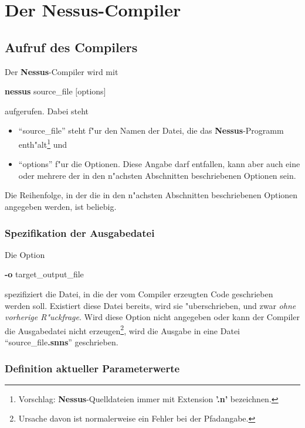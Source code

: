 \chapter{Der {\bf Nessus}-Compiler}
\label{Compiler}
\label{Umgebung}

\section{Aufruf des Compilers} 
\label{Aufruf}\label{CompilerAufruf}


Der {\bf Nessus}-Compiler wird mit

\centerline{  {\bf nessus} source\_file $[$options$]$}

aufgerufen. Dabei steht

\begin{itemize}
  \item ``source\_file'' steht f"ur den Namen der Datei, die das {\bf Nessus}-Programm
	enth"alt\footnote{Vorschlag: {\bf Nessus}-Quelldateien immer mit Extension {\bf '.n'}
	bezeichnen.} und
  \item ``options'' f"ur die Optionen. Diese Angabe darf entfallen,  kann aber auch eine oder
	mehrere der in den n"achsten Abschnitten beschriebenen  Optionen sein.
\end{itemize}

Die Reihenfolge, in der die in den n"achsten Abschnitten beschriebenen
Optionen angegeben werden, ist beliebig.


\subsection{Spezifikation der Ausgabedatei}
	 
Die Option 

\centerline{{\bf -o} target\_output\_file}

spezifiziert die Datei, in die der vom Compiler
erzeugten Code geschrieben werden soll.	 Existiert diese Datei
bereits, wird sie "uberschrieben, und zwar {\it ohne vorherige
R"uckfrage\/}. Wird diese Option nicht 	angegeben oder kann der
Compiler die Ausgabedatei nicht erzeugen\footnote{Ursache davon ist
normalerweise ein Fehler bei der Pfadangabe.}, wird die Ausgabe in
eine Datei ``source\_file{\bf .snns}'' geschrieben.
 	\addtocounter{footnote}{-1}


\subsection{Definition aktueller Parameterwerte}

